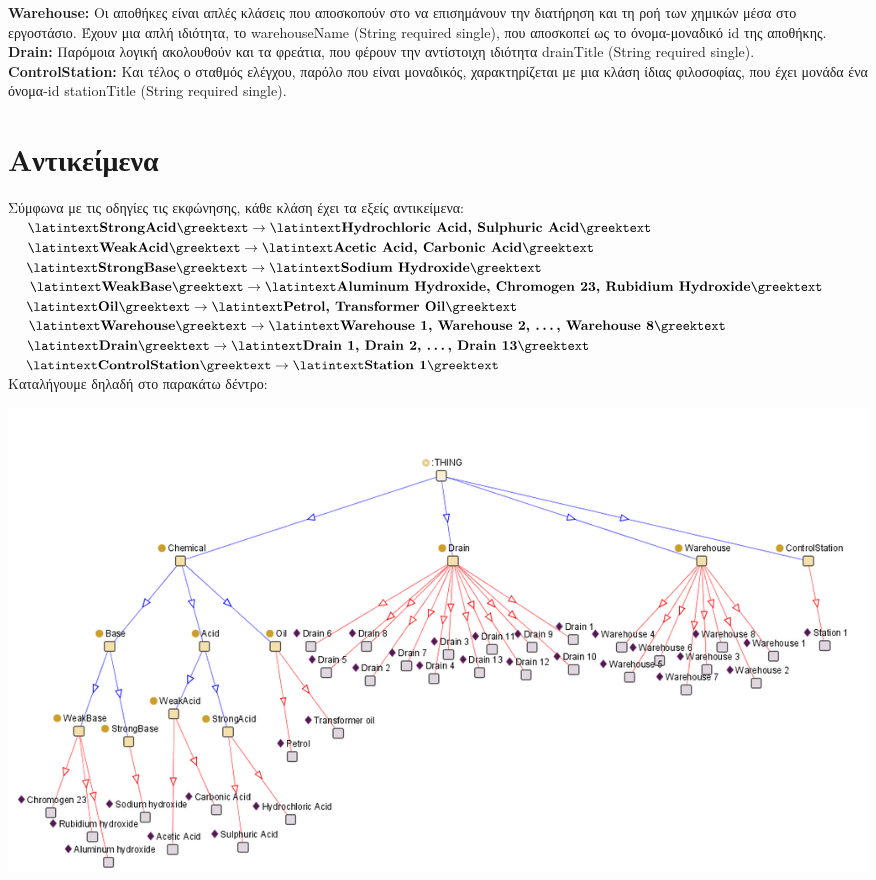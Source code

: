 \documentclass{article}
\newcommand{\blank}[1]{\hspace*{#1}}
\newcommand{\mysp}{\blank{0.3cm}}
\newcommand{\lt}[1]{\latintext #1\greektext}
\newcommand{\blt}[1]{\lt{\textbf{#1}}}
\begin{document}
    \blt{Warehouse:} Οι αποθήκες είναι απλές κλάσεις που αποσκοπούν στο να επισημάνουν την διατήρηση και τη ροή των χημικών μέσα στο εργοστάσιο. Έχουν μια απλή ιδιότητα, το \lt{warehouseName (String required single)}, που αποσκοπεί ως το όνομα-μοναδικό \lt{id} της αποθήκης.\\
    
    \blt{Drain:} Παρόμοια λογική ακολουθούν και τα φρεάτια, που φέρουν την αντίστοιχη ιδιότητα \lt{drainTitle (String required single)}.\\
    
    \blt{ControlStation:} Και τέλος ο σταθμός ελέγχου, παρόλο που είναι μοναδικός, χαρακτηρίζεται με μια κλάση ίδιας φιλοσοφίας, που έχει μονάδα ένα όνομα-id \lt{stationTitle (String required single)}. 

\newpage

\section*{Αντικείμενα}
Σύμφωνα με τις οδηγίες τις εκφώνησης, κάθε κλάση έχει τα εξείς αντικείμενα:\\

$\mysp\blt{StrongAcid} \rightarrow \blt{Hydrochloric Acid, Sulphuric Acid}$\\
$\mysp\blt{WeakAcid} \rightarrow \blt{Acetic Acid, Carbonic Acid}$\\
$\mysp\blt{StrongBase} \rightarrow \blt{Sodium Hydroxide}$\\
$\mysp\blt{WeakBase} \rightarrow \blt{Aluminum Hydroxide, Chromogen 23, Rubidium Hydroxide}$\\
$\mysp\blt{Oil} \rightarrow \blt{Petrol, Transformer Oil}$\\
$\mysp\blt{Warehouse} \rightarrow \blt{Warehouse 1, Warehouse 2, \dots, Warehouse 8}$\\
$\mysp\blt{Drain} \rightarrow \blt{Drain 1, Drain 2, \dots, Drain 13}$\\
$\mysp\blt{ControlStation} \rightarrow \blt{Station 1}$\\

Καταλήγουμε δηλαδή στο παρακάτω δέντρο:
\begin{center}
    \includegraphics[scale=0.35]{images/class-instance tree.png}
\end{center}
\end{document}

